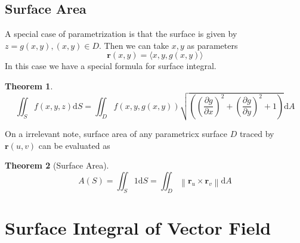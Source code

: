 \documentclass[12pt]{article}
\newcommand\norm[1]{\left\lVert#1\right\rVert}
\newtheorem{theorem}{Theorem}[section]
\theoremstyle{definition}
\newcommand{\diff}{\mathrm{d}}
\begin{document}
\subsection{Surface Area}
A special case of parametrization is that the surface is given by $z=g(x,y), (x,y)\in D$. Then we can take $x,y$ as parameters
\[
\mathbf{r}(x,y) = \langle x,y,g(x,y)\rangle
\]
In this case we have a special formula for surface integral.
\begin{theorem}
\hfill\\\normalfont 
\[
\iint_Sf(x,y,z)\diff S = \iint_Df(x,y,g(x,y))\sqrt{\left(\left(\frac{\partial g}{\partial x}\right)^2+\left(\frac{\partial g}{\partial y}\right)^2+1\right)}\diff A
\]
\end{theorem}
On a irrelevant note, surface area of any parametricx surface $D$ traced by $\mathbf{r}(u,v)$ can be evaluated as
\begin{theorem}[Surface Area]\hfill\\\normalfont
\[
A(S)=\iint_S 1\diff S = \iint_D\norm{\mathbf{r}_u\times\mathbf{r}_v}\diff A
\]\end{theorem}
\clearpage
\section{Surface Integral of Vector Field}
\end{document}
